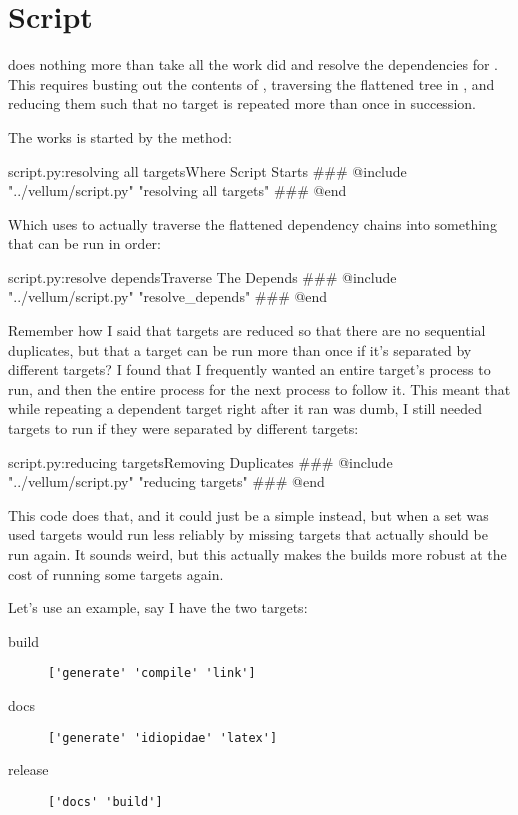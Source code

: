\section{Script}

 does nothing more than take all the work  did and 
resolve the dependencies for .  This requires busting out the
contents of , traversing the flattened tree in
, and reducing them such that no target is repeated more than
once in succession.

The works is started by the  method:

\begin{code}{script.py:resolving all targets}{Where Script Starts}
### @include "../vellum/script.py" "resolving all targets"
### @end
\end{code}

Which uses  to actually traverse the flattened
dependency chains into something that can be run in order:

\begin{code}{script.py:resolve depends}{Traverse The Depends}
### @include "../vellum/script.py" "resolve_depends"
### @end
\end{code}


Remember how I said that targets are reduced so that there are 
no sequential duplicates, but that a target can be run more than 
once if it's separated by different targets?  I found that I frequently wanted
an entire target's process to run, and then the entire process for the next
process to follow it.  This meant that while repeating a dependent target right after it
ran was dumb, I still needed targets to run if they were separated by different
targets:

\begin{code}{script.py:reducing targets}{Removing Duplicates}
### @include "../vellum/script.py" "reducing targets"
### @end
\end{code}

This code does that, and it could just be a simple  instead,
but when a set was used targets would run less reliably by missing
targets that actually should be run again.  It sounds weird, but this actually
makes the builds more robust at the cost of running some targets again.

Let's use an example, say I have the two targets:

\begin{description}
\item[build] \verb|['generate' 'compile' 'link']|
\item[docs] \verb|['generate' 'idiopidae' 'latex']|
\item[release] \verb|['docs' 'build']|
\end{description}

